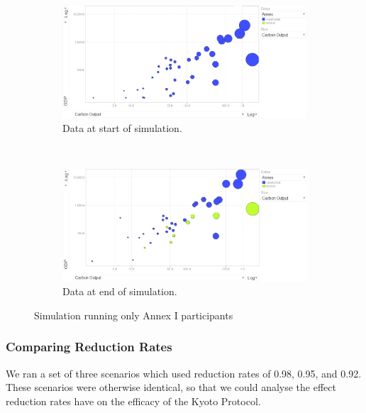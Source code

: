 \begin{figure}[H]
		\centering
        \begin{subfigure}[b]{\textwidth}
                \centering
                \includegraphics[width=\textwidth]{img/simulations/all-annex1-before.png}
				\caption{Data at start of simulation.}
				\label{subfig:all-annex1-1}
        \end{subfigure}
        \\
        \begin{subfigure}[b]{\textwidth}
                \centering
                \includegraphics[width=\textwidth]{img/simulations/all-annex1-after.png}
				\caption{Data at end of simulation.}
				\label{subfig:all-annex1-2}
        \end{subfigure}
        \caption{Simulation running only Annex I participants}\label{fig:all-annex1}
\end{figure}

\subsubsection{Comparing Reduction Rates}

We ran a set of three scenarios which used reduction rates of 0.98, 0.95, and 0.92. These scenarios were otherwise identical, so that we could analyse the effect reduction rates have on the efficacy of the Kyoto Protocol.

